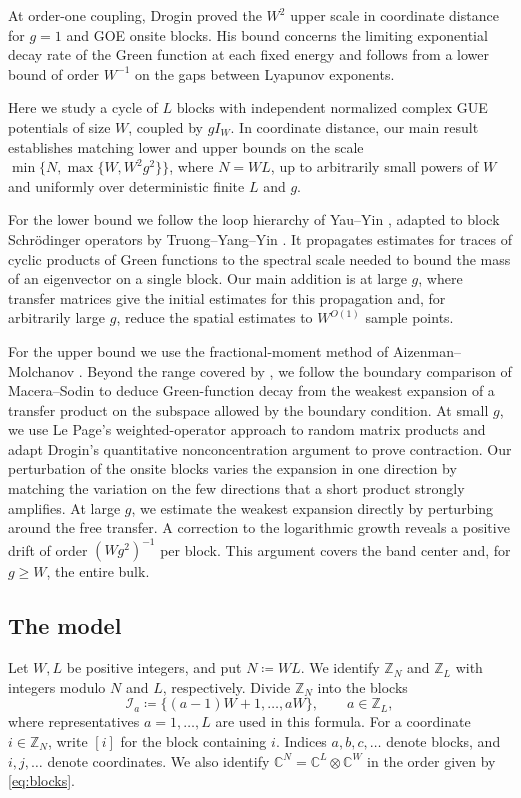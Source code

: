 \documentclass[11pt]{article}
\numberwithin{equation}{section}
\theoremstyle{remark}
\newcommand{\Z}{\mathbb Z}
\newcommand{\C}{\mathbb C}
\begin{document}
At order-one coupling, Drogin \cite{Drogin}
proved the \(W^2\) upper scale in coordinate distance for \(g=1\) and
GOE onsite blocks. His bound concerns the limiting exponential decay
rate of the Green function at each fixed energy and follows from a
lower bound of order \(W^{-1}\) on the gaps between Lyapunov exponents.

Here we study a cycle of \(L\) blocks with independent normalized
complex GUE potentials of size \(W\), coupled by \(gI_W\).
In coordinate distance, our main result establishes matching lower
and upper bounds on the scale $\min\{N,\max\{W,W^2g^2\}\}$, where
$N=WL$, up to arbitrarily small powers of $W$ and uniformly over
deterministic finite $L$ and $g$.

For the lower bound we follow the loop hierarchy of Yau--Yin
\cite{YY}, adapted to block Schr\"odinger operators by
Truong--Yang--Yin \cite{TYY}. It propagates estimates for traces of
cyclic products of Green functions to the spectral scale needed to bound
the mass of an eigenvector on a single block. Our main addition is
at large \(g\), where transfer matrices give the initial estimates
for this propagation and, for arbitrarily large \(g\), reduce the
spatial estimates to \(W^{O(1)}\) sample points.

For the upper bound we use the fractional-moment method of
Aizenman--Molchanov \cite{AM,ASFH}. Beyond the range covered by
\cite{PSSS}, we follow the boundary comparison of Macera--Sodin
\cite{MS} to deduce Green-function decay from the weakest
expansion of a transfer product on the subspace allowed by the boundary
condition. At small \(g\), we use Le Page's weighted-operator approach
to random matrix products \cite{LePage} and
adapt Drogin's quantitative nonconcentration argument
\cite{Drogin} to prove contraction. Our perturbation
of the onsite blocks varies the expansion in one direction by matching
the variation on the few directions that a short product strongly
amplifies. At large \(g\), we estimate the weakest
expansion directly by perturbing around the free transfer. A correction
to the logarithmic growth reveals a positive drift of order
\((Wg^2)^{-1}\) per block. This argument covers the band center and,
for \(g\ge W\), the entire bulk.

\subsection{The model}
\label{sec:model}

Let \(W,L\) be positive integers, and put \(N\coloneqq WL\).
We identify \(\Z_N\) and \(\Z_L\) with integers modulo \(N\) and
\(L\), respectively. Divide \(\Z_N\) into the blocks
\begin{equation}\label{eq:blocks}
 \mathcal I_a\coloneqq \{(a-1)W+1,\ldots,aW\},\qquad a\in\Z_L,
\end{equation}
where representatives \(a=1,\ldots,L\) are used in this formula.
For a coordinate \(i\in\Z_N\), write \([i]\) for the block containing
\(i\). Indices \(a,b,c,\ldots\) denote blocks, and
\(i,j,\ldots\) denote coordinates. We also identify
\(\C^N=\C^L\otimes\C^W\) in the order given by \eqref{eq:blocks}.
\end{document}
